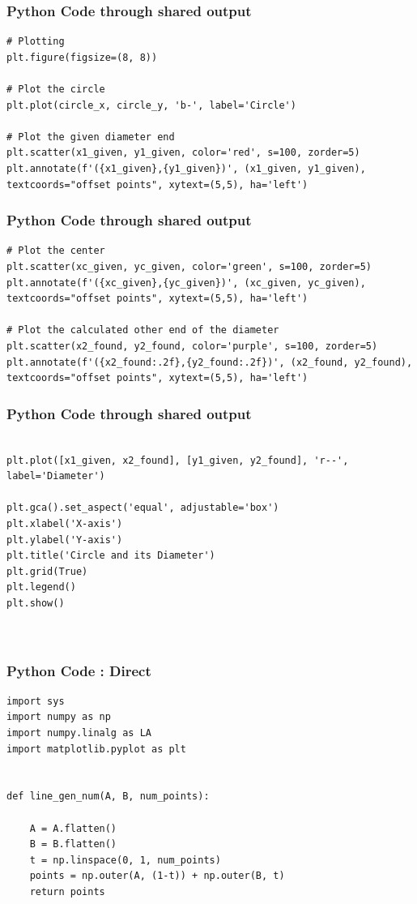 \documentclass{beamer}
\begin{document}
\begin{frame}[fragile]
\frametitle{Python Code through shared output }

\begin{lstlisting}
# Plotting
plt.figure(figsize=(8, 8))

# Plot the circle
plt.plot(circle_x, circle_y, 'b-', label='Circle')

# Plot the given diameter end
plt.scatter(x1_given, y1_given, color='red', s=100, zorder=5)
plt.annotate(f'({x1_given},{y1_given})', (x1_given, y1_given), textcoords="offset points", xytext=(5,5), ha='left')

\end{lstlisting}
\end{frame}
\begin{frame}[fragile]
\frametitle{Python Code through shared output  }

\begin{lstlisting}
# Plot the center
plt.scatter(xc_given, yc_given, color='green', s=100, zorder=5)
plt.annotate(f'({xc_given},{yc_given})', (xc_given, yc_given), textcoords="offset points", xytext=(5,5), ha='left')

# Plot the calculated other end of the diameter
plt.scatter(x2_found, y2_found, color='purple', s=100, zorder=5)
plt.annotate(f'({x2_found:.2f},{y2_found:.2f})', (x2_found, y2_found), textcoords="offset points", xytext=(5,5), ha='left')

\end{lstlisting}
\end{frame}
\begin{frame}[fragile]
\frametitle{Python Code through shared output }

\begin{lstlisting}

plt.plot([x1_given, x2_found], [y1_given, y2_found], 'r--', label='Diameter')

plt.gca().set_aspect('equal', adjustable='box')
plt.xlabel('X-axis')
plt.ylabel('Y-axis')
plt.title('Circle and its Diameter')
plt.grid(True)
plt.legend()
plt.show()



\end{lstlisting}

\end{frame}
\begin{frame}[fragile]
\frametitle{Python Code : Direct}

\begin{lstlisting}
import sys
import numpy as np
import numpy.linalg as LA
import matplotlib.pyplot as plt


def line_gen_num(A, B, num_points):
   
    A = A.flatten()
    B = B.flatten()
    t = np.linspace(0, 1, num_points)
    points = np.outer(A, (1-t)) + np.outer(B, t)
    return points
\end{lstlisting}
\end{frame}
\end{document}

